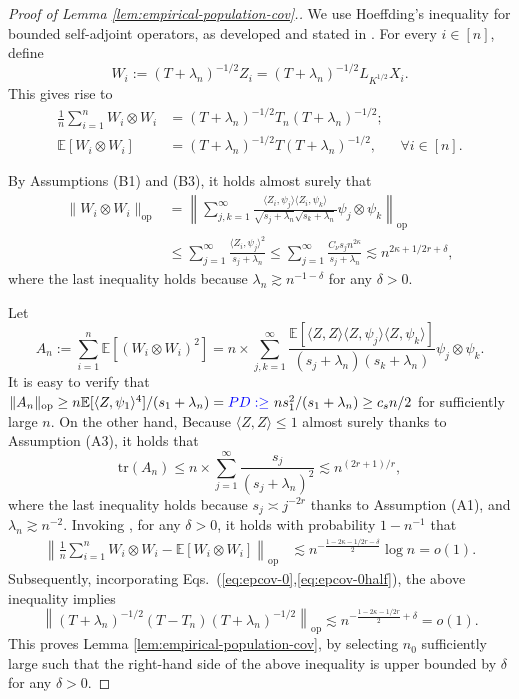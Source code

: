 \documentclass[11pt,a4paper]{article}
\newcommand{\tr}{\mathrm{tr}}
\theoremstyle{definition}
\theoremstyle{plain}
\theoremstyle{remark}
\newcommand{\op}{\mathrm{op}}
\newcommand{\pd}[1]{
	{ \color{blue} PD: #1}
}
\begin{document}
\begin{proof}[Proof of Lemma \ref{lem:empirical-population-cov}.]
We use Hoeffding's inequality for bounded self-adjoint operators, as developed and stated in \citep{minsker2017some}.
For every $i\in[n]$, define
$$
W_i := (T+\lambda_n)^{-1/2}Z_i = (T+\lambda_n)^{-1/2}L_{K^{1/2}}X_i.
$$
This gives rise to
\begin{align}
\frac{1}{n}\sum_{i=1}^n W_i\otimes W_i &= (T+\lambda_n )^{-1/2}T_n (T+\lambda_n )^{-1/2};\label{eq:epcov-0}\\
\mathbb E[W_i\otimes W_i] &= (T+\lambda_n)^{-1/2} T (T+\lambda_n )^{-1/2}, \;\;\;\;\;\;\forall i\in[n]\label{eq:epcov-0half}.
\end{align}

By Assumptions (B1) and (B3), it holds almost surely that 
\begin{align}
\|W_i\otimes W_i\|_\op&=\left\|\sum_{j,k=1}^{\infty}\frac{\langle Z_i,\psi_j\rangle\langle Z_i,\psi_k\rangle}{\sqrt{s_j+\lambda_n}\sqrt{s_k+\lambda_n}}\psi_j\otimes\psi_k\right\|_\op\nonumber\\
&\leq \sum_{j=1}^{\infty}\frac{\langle Z_i,\psi_j\rangle^2}{s_j+\lambda_n} \leq \sum_{j=1}^{\infty} \frac{C_\nu s_j n^{2\kappa}}{s_j+\lambda_n}  \lesssim n^{2\kappa+1/2r+\delta},
\label{eq:proof-epcov-1}
\end{align}
where the last inequality holds because $\lambda_n\gtrsim n^{-1-\delta}$ for any $\delta>0$. 

Let 
$$
A_n := \sum_{i=1}^n\mathbb E[(W_i\otimes W_i)^2] =n\times\sum_{j,k=1}^{\infty}\frac{\mathbb E[\langle Z,Z\rangle\langle Z,\psi_j\rangle\langle Z,\psi_k\rangle]}{(s_j+\lambda_n)(s_k+\lambda_n)}\psi_j\otimes \psi_k.
$$
It is easy to verify that $\|A_n\|_\op \geq n\mathbb E[\langle Z,\psi_1\rangle^4]/(s_1+\lambda_n)= \pd{\geq \ }  ns_1^2/(s_1+\lambda_n)\geq c_sn/2$ for sufficiently large $n$. 
On the other hand, Because $\langle Z,Z\rangle\leq 1$ almost surely thanks to Assumption (A3), it holds that
\begin{equation}
\tr(A_n) \leq n\times \sum_{j=1}^{\infty} \frac{s_j}{(s_j+\lambda_n)^2} \lesssim n^{(2r+1)/r},
\label{eq:proof-epcov-2}
\end{equation}
where the last inequality holds because $s_j\asymp j^{-2r}$ thanks to Assumption (A1), and $\lambda_n\gtrsim n^{-2}$.
Invoking \citep[Theorem 3.1]{minsker2017some}, for any $\delta>0$, it holds with probability $1-n^{-1}$ that
\begin{align*}
\left\|\frac{1}{n}\sum_{i=1}^n W_i\otimes W_i-\mathbb E[W_i\otimes W_i]\right\|_\op &\lesssim n^{-\frac{1-2\kappa-1/2r-\delta}{2}}\log n = o(1). 
\end{align*}
Subsequently, incorporating Eqs.~(\ref{eq:epcov-0},\ref{eq:epcov-0half}), the above inequality implies
$$
\left\|(T+\lambda_n)^{-1/2}(T-T_n)(T+\lambda_n)^{-1/2}\right\|_\op \lesssim n^{-\frac{1-2\kappa-1/2r}{2}+\delta} = o(1).
$$
This proves Lemma \ref{lem:empirical-population-cov}, by selecting $n_0$ sufficiently large such that the right-hand side of the above inequality is upper bounded by $\delta$ for any $\delta>0$.
\end{proof}
\end{document}
